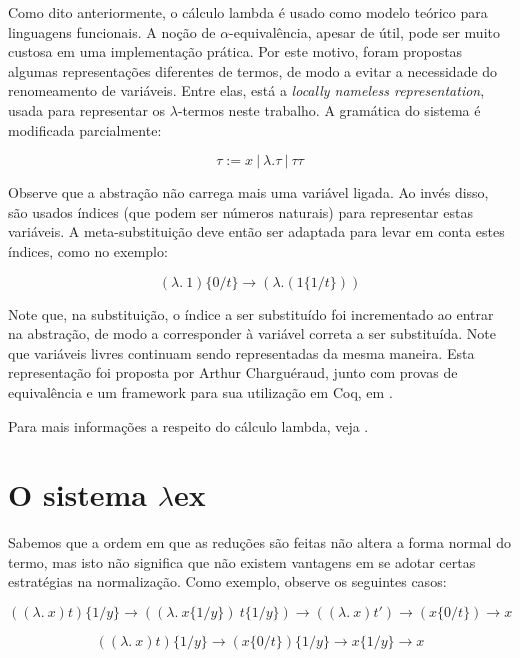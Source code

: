 Como dito anteriormente, o cálculo lambda é usado como modelo teórico para
linguagens funcionais. A noção de $\alpha$-equivalência, apesar de útil, pode ser
muito custosa em uma implementação prática. Por este motivo, foram propostas
algumas representações diferentes de termos, de modo a evitar a necessidade do
renomeamento de variáveis. Entre elas, está a \textit{locally nameless
    representation}, usada para representar os $\lambda$-termos neste trabalho.
A gramática do sistema é modificada parcialmente:

\[ \tau := x\ |\ \lambda . \tau\ |\ \tau \tau \]

Observe que a abstração não carrega mais uma variável ligada. Ao invés disso,
são usados índices (que podem ser números naturais) para representar estas
variáveis. A meta-substituição deve então ser adaptada para levar em conta estes
índices, como no exemplo:

\[ (\lambda.\ 1) \{0/t\} \rightarrow ( \lambda. (1 \{1/t\}) ) \]

Note que, na substituição, o índice a ser substituído foi incrementado ao entrar
na abstração, de modo a corresponder à variável correta a ser substituída. Note
que variáveis livres continuam sendo representadas da mesma maneira. Esta
representação foi proposta por Arthur Charguéraud, junto com provas de
equivalência e um framework para sua utilização em Coq, em \cite{chargueraud}.

Para mais informações a respeito do cálculo lambda, veja \cite{barendregt}.


\section{O sistema $\lambda$ex}

Sabemos que a ordem em que as reduções são feitas não altera a forma normal do
termo, mas isto não significa que não existem vantagens em se adotar certas
estratégias na normalização. Como exemplo, observe os seguintes casos:

\[ ((\lambda.\ x) t) \{1/y\} \rightarrow ((\lambda.\ x\{1/y\})\ t\{1/y\}) 
    \rightarrow ((\lambda.\ x) t') \rightarrow (x\{0/t\}) \rightarrow x
\]

\[ ((\lambda.\ x) t) \{1/y\} \rightarrow (x\{0/t\}) \{1/y\} 
    \rightarrow x \{1/y\} \rightarrow x \]

